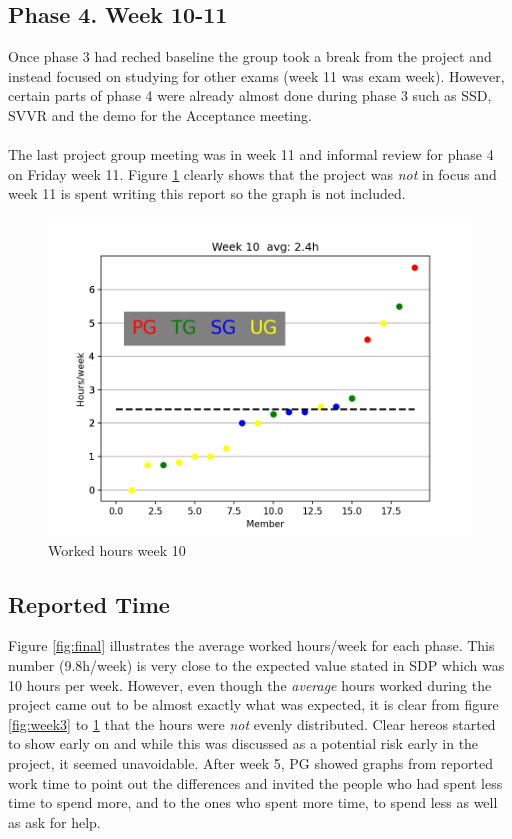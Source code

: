 \documentclass{article}
\begin{document}
    \subsection{Phase 4. Week 10-11 \label{phase4}}
        Once phase 3 had reched baseline the group took a break from the project and instead
        focused on studying for other exams (week 11 was exam week). However, certain parts
        of phase 4 were already almost done during phase 3 such as SSD, SVVR and the demo
        for the Acceptance meeting. 
        \\ \\
        The last project group meeting was in week 11 and informal review for phase 4 on 
        Friday week 11. Figure \ref{fig:week10} clearly shows that the project was \emph{not}
        in focus and week 11 is spent writing this report so the graph is not included.
        \begin{figure}[!htb]
            \centering
              \includegraphics[width=\linewidth]{images/week_10.png}
              \caption{Worked hours week 10}\label{fig:week10}
            \endminipage\hfill
        \end{figure}

    \subsection{Reported Time \label{reported_time}}
        Figure \ref{fig:final} illustrates the average worked hours/week for each phase.
        This number (9.8h/week) is very close to the expected value stated in SDP which was 10
        hours per week. However, even though the \emph{average} hours worked during the project came out to be 
        almost exactly what was expected, it is clear from figure \ref{fig:week3} to \ref{fig:week10}
        that the hours were \emph{not} evenly distributed. Clear hereos started to show early
        on and while this was discussed as a potential risk early in the project, it seemed unavoidable.
        After week 5, PG showed graphs from reported work time to point out the differences and 
        invited the people who had spent less time to spend more, and to the ones who spent more time,
        to spend less as well as ask for help. 
    
\end{document}
